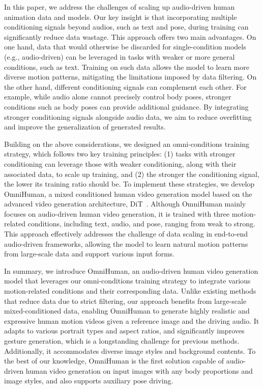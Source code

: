 In this paper, we address the challenges of scaling up audio-driven human animation data and models. Our key insight is that incorporating multiple conditioning signals beyond audios, such as text and pose, during training can significantly reduce data wastage. This approach offers two main advantages. On one hand, data that would otherwise be discarded for single-condition models (e.g., audio-driven) can be leveraged in tasks with weaker or more general conditions, such as text. Training on such data allows the model to learn more diverse motion patterns, mitigating the limitations imposed by data filtering. On the other hand, different conditioning signals can complement each other. For example, while audio alone cannot precisely control body poses, stronger conditions such as body poses can provide additional guidance. By integrating stronger conditioning signals alongside audio data, we aim to reduce overfitting and improve the generalization of generated results.


Building on the above considerations, we designed an omni-conditions training strategy, which follows two key training principles: (1) tasks with stronger conditioning can leverage those with weaker conditioning, along with their associated data, to scale up training, and (2) the stronger the conditioning signal, the lower its training ratio should be. To implement these strategies, we develop OmniHuman, a mixed conditioned human video generation model based on the advanced video generation architecture, DiT~\cite{dit,sd3}. Although OmniHuman mainly focuses on audio-driven human video generation, it is trained with three motion-related conditions, including text, audio, and pose, ranging from weak to strong. This approach effectively addresses the challenge of data scaling in end-to-end audio-driven frameworks, allowing the model to learn natural motion patterns from large-scale data and support various input forms.



In summary, we introduce OmniHuman, an audio-driven human video generation model that leverages our omni-conditions training strategy to integrate various motion-related conditions and their corresponding data. Unlike existing methods that reduce data due to strict filtering, our approach benefits from large-scale mixed-conditioned data, enabling OmniHuman to generate highly realistic and expressive human motion videos given a reference image and the driving audio. It adapts to various portrait types and aspect ratios, and significantly improves gesture generation, which is a longstanding challenge for previous methods. Additionally, it accommodates diverse image styles and background contents. To the best of our knowledge, OmniHuman is the first solution capable of audio-driven human video generation on input images with any body proportions and image styles, and also supports auxiliary pose driving.
